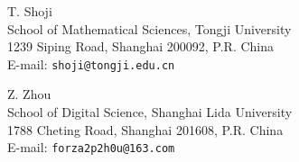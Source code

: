 \documentclass[12pt]{amsart}
\renewcommand{\1}{\mathbb 1}
\numberwithin{equation}{section}
\begin{document}
\par\vspace{1.5cm}
\noindent
T. Shoji \\
School of Mathematical Sciences, Tongji University \\ 
1239 Siping Road, Shanghai 200092, P.R. China  \\
E-mail: \verb|shoji@tongji.edu.cn|

\par\vspace{0.5cm}
\noindent
Z. Zhou \\
School of Digital Science, Shanghai Lida University \\ 
1788 Cheting Road, Shanghai 201608, P.R. China  \\
E-mail: \verb|forza2p2h0u@163.com|
\end{document}
